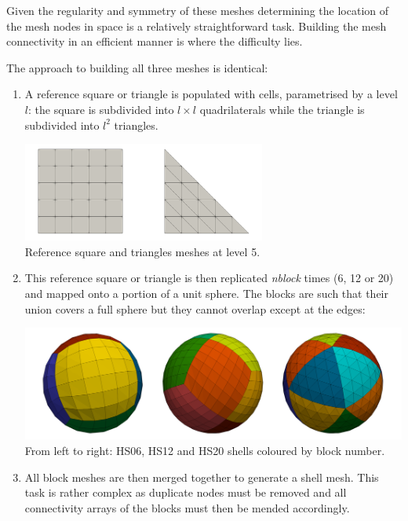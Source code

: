 Given the regularity and symmetry of these meshes determining the location of the 
mesh nodes in space is a relatively straightforward task. Building the mesh connectivity in an 
efficient manner is where the difficulty lies.

The approach to building all three meshes is identical:
\begin{enumerate}
\item A reference square or triangle is populated with cells,
parametrised by a level $l$: the square is subdivided into $l\times l$ quadrilaterals while 
the triangle is subdivided into $l^2$ triangles.
\begin{center}
\includegraphics[width=8cm]{images/ghost/f01_basics}\\
{\captionfont Reference square and triangles meshes at level 5.}
\end{center}

\item This reference square or triangle is then replicated {\sl nblock} times (6, 12 or 20) and mapped
onto a portion of a unit sphere. The blocks are such that their union covers a full sphere
but they cannot overlap except at the edges:
\begin{center}
\includegraphics[width=.8\linewidth]{images/ghost/f02}\\
{\captionfont From left to right: HS06, HS12 and HS20 shells coloured by block number.}
\end{center}

\item All block meshes are then merged together to generate a shell mesh. This task is rather 
complex as duplicate nodes must be removed and all connectivity arrays of the blocks must then 
be mended accordingly. 


\end{enumerate}
